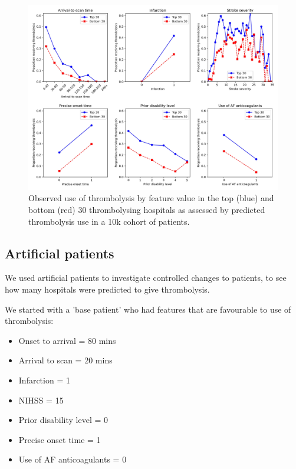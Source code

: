 \begin{figure}
\centering
\includegraphics[width=1\textwidth]{./images/09_compare_thrombolysis_by_feature}
\caption{Observed use of thrombolysis by feature value in the top (blue) and bottom (red) 30 thrombolysing hospitals as assessed by predicted thrombolysis use in a 10k cohort of patients.}
\label{fig:thrombolysis_by_feature_value}
\end{figure}


\subsection{Artificial patients}

We used artificial patients to investigate controlled changes to patients, to see how many hospitals were predicted to give thrombolysis.

We started with a 'base patient' who had features that are favourable to use of thrombolysis:

\begin{itemize}
\item Onset to arrival = 80 mins
\item Arrival to scan = 20 mins
\item Infarction = 1
\item NIHSS = 15
\item Prior disability level = 0
\item Precise onset time = 1
\item Use of AF anticoagulants = 0
\end{itemize}

